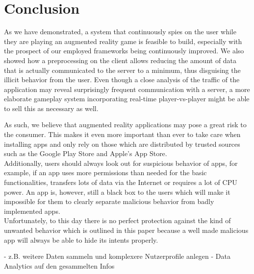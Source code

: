\section{Conclusion}
\label{sec:conclusion}

As we have demonstrated, a system that continuously spies on the user while they are playing an augmented reality game is feasible to build, especially with the prospect of our employed frameworks being continuously improved. We also showed how a preprocessing on the client allows reducing the amount of data that is actually communicated to the server to a minimum, thus disguising the illicit behavior from the user. Even though a close analysis of the traffic of the application may reveal surprisingly frequent communication with a server, a more elaborate gameplay system incorporating real-time player-vs-player might be able to sell this as necessary as well.

As such, we believe that augmented reality applications may pose a great risk to the consumer. 
This makes it even more important than ever to take care when installing apps and only rely on those which are distributed by trusted sources such as the Google Play Store and Apple's App Store. \\
Additionally, users should always look out for suspicious behavior of apps, for example, if an app uses more permissions than needed for the basic functionalities, transfers lots of data via the Internet or requires a lot of CPU power.
An app is, however, still a black box to the users which will make it impossible for them to clearly separate malicious behavior from badly implemented apps.\\
Unfortunately, to this day there is no perfect protection against the kind of unwanted behavior which is outlined in this paper because a well made malicious app will always be able to hide its intents properly.


- z.B. weitere Daten sammeln und komplexere Nutzerprofile anlegen
- Data Analytics auf den gesammelten Infos
